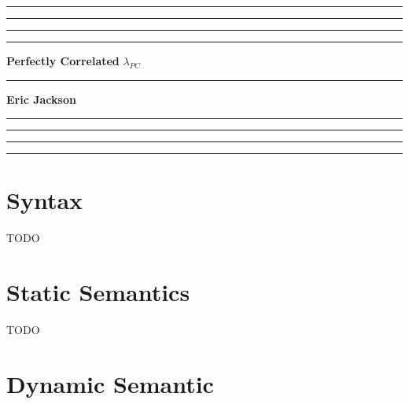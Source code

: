 \documentclass{article}
\begin{document}
	\hrule
	\smallskip
	\hrule\hrule\hrule
	\medskip
	\noindent
	{\huge \bf Perfectly Correlated}
	\medskip
	\newline
	{\huge \it $\lambda_{PC}$}
	\smallskip
	\hrule
	\medskip
	\noindent
	{\Large \bf Eric Jackson}
	\medskip
	\hrule\hrule\hrule
	\smallskip
	\hrule

\section{Syntax}

TODO

\section{Static Semantics}

TODO

\section{Dynamic Semantic}

\end{document}
